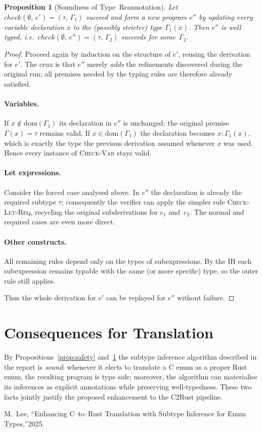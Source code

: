 \documentclass[peerreview, 10pt]{IEEEtran}
\newcommand{\checktype}[4]{\ensuremath{{check}(#1,\,#2)=(#3,\,#4)}}
\theoremstyle{plain}
\newtheorem{prop}{Proposition}
\begin{document}
\begin{prop}[Soundness of Type~Reannotation]\label{prop:reannot}
Let $\checktype{\emptyset}{e'}{\tau}{\Gamma_1}$ succeed and form a new program $e''$ by updating every variable declaration $x$ to the (possibly stricter) type $\Gamma_1(x)$.  Then $e''$ is well typed, i.e.\ $\checktype{\emptyset}{e''}{\tau}{\Gamma_2}$ succeeds for some~$\Gamma_2$.
\end{prop}

\begin{proof}
Proceed again by induction on the structure of $e'$, reusing the derivation for $e'$.  The crux is that $e''$ merely \emph{adds} the refinements discovered during the original run; all premises needed by the typing rules are therefore already satisfied.

\paragraph*{Variables.}  If $x\notin\mathrm{dom}(\Gamma_1)$ its declaration in $e''$ is unchanged; the original premise $\Gamma(x)=\tau$ remains valid.  If $x\in\mathrm{dom}(\Gamma_1)$ the declaration becomes $x{:}\Gamma_1(x)$, which is exactly the type the previous derivation assumed whenever $x$ was used.  Hence every instance of \textsc{Check-Var} stays valid.

\paragraph*{Let expressions.}  Consider the forced case analysed above.  In $e''$ the declaration is already the required subtype $\tau$; consequently the verifier can apply the simpler rule \textsc{Check-Let-Req}, recycling the original subderivations for $e_1$ and~$e_2$.  The normal and required cases are even more direct.

\paragraph*{Other constructs.}  All remaining rules depend only on the types of subexpressions.  By the IH each subexpression remains typable with the same (or more specific) type, so the outer rule still applies.

Thus the whole derivation for $e'$ can be replayed for $e''$ without failure.\end{proof}

\section{Consequences for Translation}
By Propositions~\ref{prop:safety} and~\ref{prop:reannot} the subtype inference algorithm described in the report is \emph{sound}: whenever it elects to translate a C enum as a proper \textsf{Rust} enum, the resulting program is type safe; moreover, the algorithm can materialise its inferences as explicit annotations while preserving well\nobreakdash-typedness.  These two facts jointly justify the proposed enhancement to the \textsf{C2Rust} pipeline.


\begin{thebibliography}{1}
  M.~Lee, ``Enhancing C--to--Rust Translation with Subtype Inference for Enum Types,''\hspace*{0.2em}2025.
\end{thebibliography}
\end{document}
